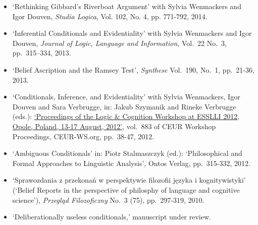 \documentclass[a4paper,12pt]{article}
\begin{document}
\begin{small}
\begin{itemize}

  \end{itemize}


  \begin{itemize}
    \item `Rethinking Gibbard's Riverboat Argument' with Sylvia Wenmackers and Igor Douven, \emph{Studia Logica}, Vol. 102, No. 4, pp. 771-792, 2014.

    \item `Inferential Conditionals and Evidentiality' with Sylvia Wenmackers and Igor Douven, \emph{Journal of Logic, Language and Information}, Vol.~22 No.~3, pp.~315–334, 2013.

    \item `Belief Ascription and the Ramsey Test', \emph{Synthese} Vol.~190, No.~1, pp.~21-36, 2013. %

    \item `Conditionals, Inference, and Evidentiality' with Sylvia Wenmackers, Igor Douven and Sara Verbrugge, in: Jakub Szymanik and Rineke Verbrugge (eds.): \href{http://ceur-ws.org/Vol-883/}{`Proceedings of the Logic \& Cognition Workshop at ESSLLI 2012, Opole, Poland, 13-17 August, 2012'}, vol.~883 of CEUR Workshop Proceedings, CEUR-WS.org, pp.~38-47, 2012.

    \item `Ambiguous Conditionals' in: Piotr Stalmaszczyk (ed.): `Philosophical and Formal Approaches to Linguistic Analysis', Ontos Verlag, pp.~315-332, 2012.

    \item `Sprawozdania z przekonań w perspektywie filozofii języka i kognitywistyki' (`Belief Reports in the perspective of philosphy of language and cognitive science'), \emph{Przegląd Filozoficzny} No.~3 (75), pp.~297-319, 2010.

  \end{itemize}

  \begin{itemize}
   \item `Deliberationally useless conditionals,' manuscript under review.
    

\end{itemize}
\end{small}
\end{document}
